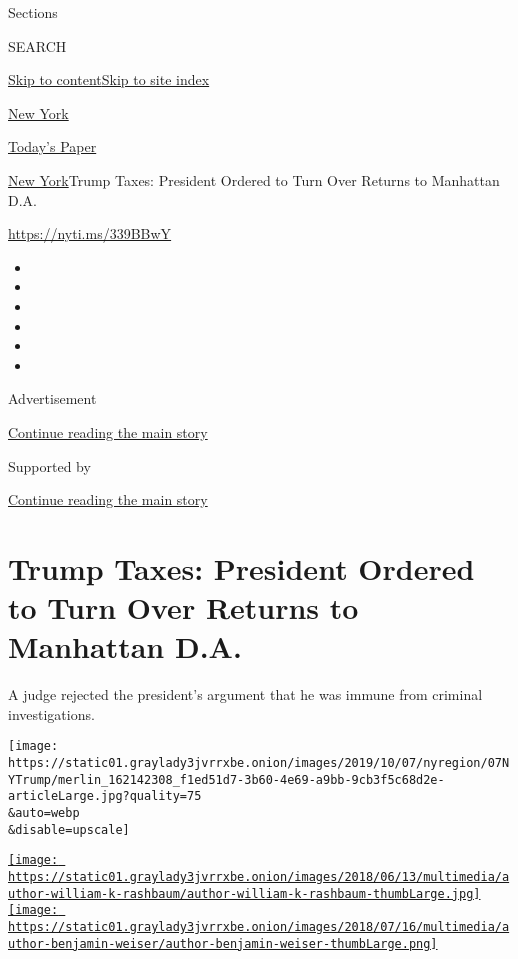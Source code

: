 Sections

SEARCH

\protect\hyperlink{site-content}{Skip to
content}\protect\hyperlink{site-index}{Skip to site index}

\href{https://www.nytimes3xbfgragh.onion/section/nyregion}{New York}

\href{https://myaccount.nytimes3xbfgragh.onion/auth/login?response_type=cookie\&client_id=vi}{}

\href{https://www.nytimes3xbfgragh.onion/section/todayspaper}{Today's
Paper}

\href{/section/nyregion}{New York}\textbar{}Trump Taxes: President
Ordered to Turn Over Returns to Manhattan D.A.

\url{https://nyti.ms/339BBwY}

\begin{itemize}
\item
\item
\item
\item
\item
\item
\end{itemize}

Advertisement

\protect\hyperlink{after-top}{Continue reading the main story}

Supported by

\protect\hyperlink{after-sponsor}{Continue reading the main story}

\hypertarget{trump-taxes-president-ordered-to-turn-over-returns-to-manhattan-da}{%
\section{Trump Taxes: President Ordered to Turn Over Returns to
Manhattan
D.A.}\label{trump-taxes-president-ordered-to-turn-over-returns-to-manhattan-da}}

A judge rejected the president's argument that he was immune from
criminal investigations.

\texttt{[image: https://static01.graylady3jvrrxbe.onion/images/2019/10/07/nyregion/07NYTrump/merlin\_162142308\_f1ed51d7-3b60-4e69-a9bb-9cb3f5c68d2e-articleLarge.jpg?quality=75\\\&auto=webp\\\&disable=upscale]}

\href{https://www.nytimes3xbfgragh.onion/by/william-k-rashbaum}{\texttt{[image: https://static01.graylady3jvrrxbe.onion/images/2018/06/13/multimedia/author-william-k-rashbaum/author-william-k-rashbaum-thumbLarge.jpg]}}\href{https://www.nytimes3xbfgragh.onion/by/benjamin-weiser}{\texttt{[image: https://static01.graylady3jvrrxbe.onion/images/2018/07/16/multimedia/author-benjamin-weiser/author-benjamin-weiser-thumbLarge.png]}}

